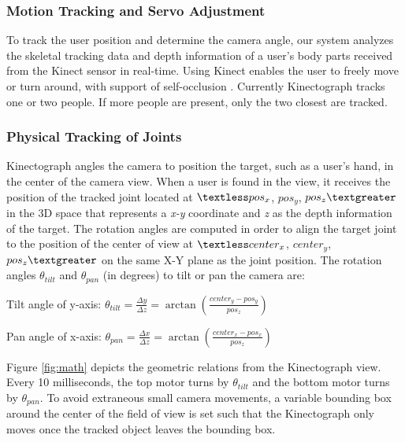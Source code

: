 \subsubsection{Motion Tracking and Servo Adjustment}
To track the user position and determine the camera angle, our system analyzes the skeletal tracking data and depth information of a user’s body parts received from the Kinect sensor in real-time. Using Kinect enables the user to freely move or turn around, with support of self-occlusion \cite{Shotton:2011ud}. Currently Kinectograph tracks one or two people. If more people are present, only the two closest are tracked.

\subsubsection{Physical Tracking of Joints}
Kinectograph angles the camera to position the target, such as a user's hand, in the center of the camera view. When a user is found in the view, it receives the position of the tracked joint located at $\textless pos_{x}$, $pos_{y}$, $pos_{z} \textgreater$ in the 3D space that represents a {\em x-y} coordinate and {\em z} as the depth information of the target. The rotation angles are computed in order to align the target joint to the position of the center of view at $\textless center_{x}$, $center_{y}$, $pos_{z}\textgreater$  on the same X-Y plane as the joint position. The rotation angles $\theta_{tilt}$ and $\theta_{pan}$ (in degrees) to tilt or pan the camera are:

\vspace{12pt}
Tilt angle of y-axis:
$\theta_{tilt}=\frac{\Delta y}{\Delta z}=\arctan{(\frac{center_{y}-pos_{y}}{pos_{z}})}$

\vspace{12pt}
Pan angle of x-axis:
$\theta_{pan}=\frac{\Delta x}{\Delta z}=\arctan{(\frac{center_{x}-pos_{x}}{pos_{z}})}$
\vspace{12pt}

Figure \ref{fig:math} depicts the geometric relations from the Kinectograph view. Every 10 milliseconds, the top motor turns by $\theta_{tilt}$ and the bottom motor turns by $\theta_{pan}$. To avoid extraneous small camera movements, a variable bounding box around the center of the field of view is set such that the Kinectograph only moves once the tracked object leaves the bounding box.


